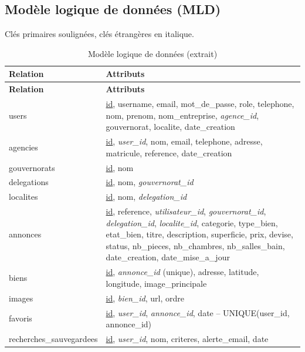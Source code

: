 \subsection{Modèle logique de données (MLD)}
Clés primaires soulignées, clés étrangères en italique.

\begin{longtable}{p{3.2cm} p{10.3cm}}
\caption{Modèle logique de données (extrait)}\label{tab:mld}\\
\toprule
\textbf{Relation} & \textbf{Attributs} \\
\midrule
\endfirsthead
\toprule
\textbf{Relation} & \textbf{Attributs} \\
\midrule
\endhead
users        & \underline{id}, username, email, mot\_de\_passe, role, telephone, nom, prenom, nom\_entreprise, \textit{agence\_id}, gouvernorat, localite, date\_creation \\
agencies     & \underline{id}, \textit{user\_id}, nom, email, telephone, adresse, matricule, reference, date\_creation \\
gouvernorats & \underline{id}, nom \\
delegations  & \underline{id}, nom, \textit{gouvernorat\_id} \\
localites    & \underline{id}, nom, \textit{delegation\_id} \\
annonces     & \underline{id}, reference, \textit{utilisateur\_id}, \textit{gouvernorat\_id}, \textit{delegation\_id}, \textit{localite\_id}, categorie, type\_bien, etat\_bien, titre, description, superficie, prix, devise, status, nb\_pieces, nb\_chambres, nb\_salles\_bain, date\_creation, date\_mise\_a\_jour \\
biens        & \underline{id}, \textit{annonce\_id} (unique), adresse, latitude, longitude, image\_principale \\
images       & \underline{id}, \textit{bien\_id}, url, ordre \\
favoris      & \underline{id}, \textit{user\_id}, \textit{annonce\_id}, date \; -- \; UNIQUE(user\_id, annonce\_id) \\
recherches\_sauvegardees & \underline{id}, \textit{user\_id}, nom, criteres, alerte\_email, date \\
\bottomrule
\end{longtable}

